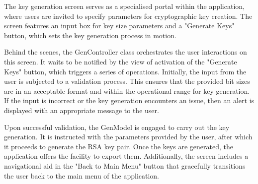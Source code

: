 \documentclass[]{final_report}
\theoremstyle{definition}
\begin{document}
The key generation screen serves as a specialised portal within the application, where users are invited to specify parameters for cryptographic key creation. The screen features an input box for key size parameters and a "Generate Keys" button, which sets the key generation process in motion.

Behind the scenes, the GenController class orchestrates the user interactions on this screen. It waits to be notified by the view of activation of the "Generate Keys" button, which triggers a series of operations. Initially, the input from the user is subjected to a validation process. This ensures that the provided bit sizes are in an acceptable format and within the operational range for key generation. If the input is incorrect or the key generation encounters an issue, then an alert is displayed with an appropriate message to the user. 

Upon successful validation, the GenModel is engaged to carry out the key generation. It is instructed with the parameters provided by the user, after which it proceeds to generate the RSA key pair. Once the keys are generated, the application offers the facility to export them. Additionally, the screen includes a navigational aid in the "Back to Main Menu" button that gracefully transitions the user back to the main menu of the application.
\end{document}
